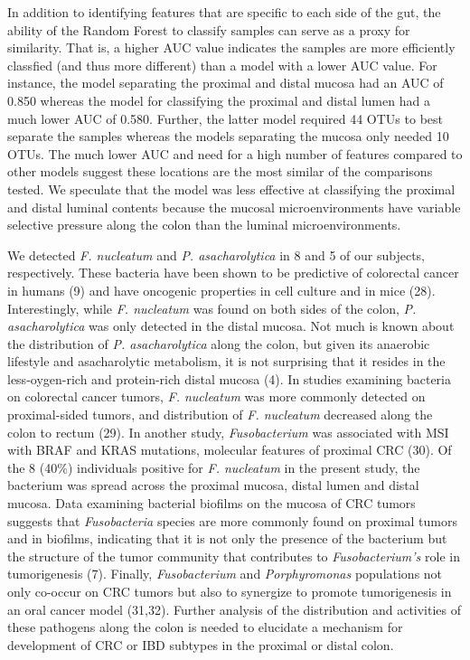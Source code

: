 \documentclass[12pt,]{article}
\begin{document}
In addition to identifying features that are specific to each side of
the gut, the ability of the Random Forest to classify samples can serve
as a proxy for similarity. That is, a higher AUC value indicates the
samples are more efficiently classfied (and thus more different) than a
model with a lower AUC value. For instance, the model separating the
proximal and distal mucosa had an AUC of 0.850 whereas the model for
classifying the proximal and distal lumen had a much lower AUC of 0.580.
Further, the latter model required 44 OTUs to best separate the samples
whereas the models separating the mucosa only needed 10 OTUs. The much
lower AUC and need for a high number of features compared to other
models suggest these locations are the most similar of the comparisons
tested. We speculate that the model was less effective at classifying
the proximal and distal luminal contents because the mucosal
microenvironments have variable selective pressure along the colon than
the luminal microenvironments.

We detected \emph{F. nucleatum} and \emph{P. asacharolytica} in 8 and 5
of our subjects, respectively. These bacteria have been shown to be
predictive of colorectal cancer in humans (9) and have oncogenic
properties in cell culture and in mice (28). Interestingly, while
\emph{F. nucleatum} was found on both sides of the colon, \emph{P.
asacharolytica} was only detected in the distal mucosa. Not much is
known about the distribution of \emph{P. asacharolytica} along the
colon, but given its anaerobic lifestyle and asacharolytic metabolism,
it is not surprising that it resides in the less-oygen-rich and
protein-rich distal mucosa (4). In studies examining bacteria on
colorectal cancer tumors, \emph{F. nucleatum} was more commonly detected
on proximal-sided tumors, and distribution of \emph{F. nucleatum}
decreased along the colon to rectum (29). In another study,
\emph{Fusobacterium} was associated with MSI with BRAF and KRAS
mutations, molecular features of proximal CRC (30). Of the 8 (40\%)
individuals positive for \emph{F. nucleatum} in the present study, the
bacterium was spread across the proximal mucosa, distal lumen and distal
mucosa. Data examining bacterial biofilms on the mucosa of CRC tumors
suggests that \emph{Fusobacteria} species are more commonly found on
proximal tumors and in biofilms, indicating that it is not only the
presence of the bacterium but the structure of the tumor community that
contributes to \emph{Fusobacterium's} role in tumorigenesis (7).
Finally, \emph{Fusobacterium} and \emph{Porphyromonas} populations not
only co-occur on CRC tumors but also to synergize to promote
tumorigenesis in an oral cancer model (31,32). Further analysis of the
distribution and activities of these pathogens along the colon is needed
to elucidate a mechanism for development of CRC or IBD subtypes in the
proximal or distal colon.
\end{document}
